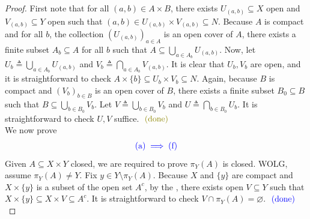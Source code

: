 \documentclass{report}
\begin{document}
\begin{proof}
First note that for all $(a, b) \in A \times B$, there exists $U_{(a,b)} \subseteq X$ open and $V_{(a,b)} \subseteq Y$ open such that $(a, b) \in U_{(a,b)} \times V_{(a,b)} \subseteq N$. Because $A$ is compact and for all $b$, the collection $(U_{(a,b)})_{a \in A}$ is an open cover of $A$, there exists a finite subset $A_b \subseteq A$ for all $b$ such that $A \subseteq \bigcup_{a \in A_b} U_{(a,b)}$. Now, let $U_b \triangleq \bigcup_{a \in A_b} U_{(a,b)}$ and $V_b \triangleq \bigcap_{a \in A_b} V_{(a,b)}$. It is clear that $U_b, V_b$ are open, and it is straightforward to check $A \times \{b\} \subseteq U_b \times V_b \subseteq N$. Again, because $B$ is compact and $(V_b)_{b \in B}$ is an open cover of $B$, there exists a finite subset $B_0 \subseteq B$ such that $B \subseteq \bigcup_{b \in B_0} V_b$. Let $V \triangleq \bigcup_{b \in B_0} V_b$ and $U \triangleq \bigcap_{b \in B_0} U_b$. It is straightforward to check $U, V$ suffice. $\odone$ \\


We now prove 
\begin{align*}
\textcolor{blue}{(\text{a})\implies (\text{f})}
\end{align*}
Given $A \subseteq X \times Y$ closed, we are required to prove $\pi_Y(A)$ is closed. WOLG, assume $\pi_Y(A) \neq Y$. Fix $y \in Y \setminus \pi_Y(A)$. Because $X$ and $\{y\}$ are compact and $X \times \{y\}$ is a subset of the open set $A^c$, by the , there exists open $V \subseteq Y$ such that $X \times \{y\} \subseteq X \times V \subseteq A^c$. It is straightforward to check $V \cap \pi_Y(A) = \varnothing$. $\textcolor{blue}{\text{ (done) }}$ \\


\end{proof}
\end{document}

